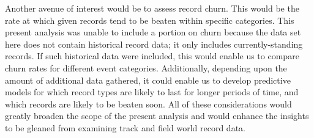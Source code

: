 \documentclass{article}
\begin{document}
Another avenue of interest would be to assess record churn.  This would be the rate at which given records tend to 
be beaten within specific categories.  This present analysis was unable to include a portion on churn because the 
data set here does not contain historical record data; it only includes currently-standing records.  If such 
historical data were included, this would enable us to compare churn rates for different event categories.  
Additionally, depending upon the amount of additional data gathered, it could enable us to develop predictive 
models for which record types are likely to last for longer periods of time, and which records are likely to be 
beaten soon.  All of these considerations would greatly broaden the scope of the present analysis and would enhance 
the insights to be gleaned from examining track and field world record data.  
\end{document}
